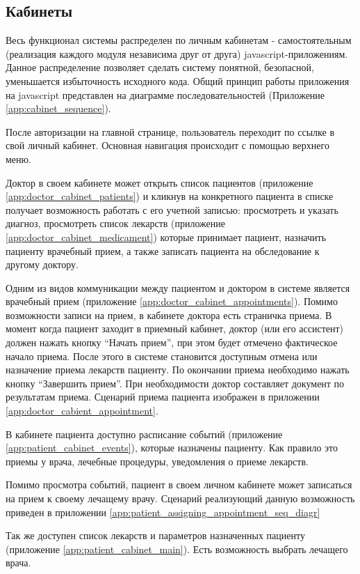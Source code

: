 \subsection{Кабинеты}
Весь функционал системы распределен по личным кабинетам - самостоятельным
(реализация каждого модуля независима друг от друга) javascript-приложениям.
Данное распределение позволяет сделать систему понятной, безопасной, уменьшается
избыточность исходного кода. Общий принцип работы приложения на javascript
представлен на диаграмме последовательностей (Приложение
\ref{app:cabinet_sequence}).

После авторизации на главной странице, пользователь переходит по ссылке в свой
личный кабинет. Основная навигация происходит с помощью верхнего меню.

Доктор в своем кабинете может открыть список пациентов (приложение
\ref{app:doctor_cabinet_patients}) и кликнув на конкретного пациента в списке
получает возможность работать с его учетной записью:
просмотреть и указать диагноз, просмотреть список лекарств (приложение
\ref{app:doctor_cabinet_medicament}) которые принимает пациент, назначить
пациенту врачебный прием, а также записать пациента на обследование к другому
доктору.

Одним из видов коммуникации между пациентом и доктором в системе является
врачебный прием (приложение \ref{app:doctor_cabinet_appointments}). Помимо
возможности записи на прием, в кабинете доктора есть страничка приема. В момент
когда пациент заходит в приемный кабинет, доктор (или его ассистент) должен
нажать кнопку “Начать прием”, при этом будет отмечено фактическое начало приема.
После этого в системе становится доступным отмена или назначение приема лекарств
пациенту. По окончании приема необходимо нажать кнопку “Завершить прием”. При
необходимости доктор составляет документ по результатам приема.
Сценарий приема пациента изображен в приложении
\ref{app:doctor_cabient_appointment}.

В кабинете пациента доступно расписание событий (приложение
\ref{app:patient_cabinet_events}), которые назначены пациенту.
Как правило это приемы у врача, лечебные процедуры, уведомления о приеме
лекарств.

Помимо просмотра событий, пациент в своем личном кабинете может записаться на
прием к своему лечащему врачу. Сценарий реализующий данную возможность приведен
в приложении \ref{app:patient_assigning_appointment_seq_diagr}

Так же доступен список лекарств и параметров назначенных пациенту (приложение
\ref{app:patient_cabinet_main}).
Есть возможность выбрать лечащего врача.

